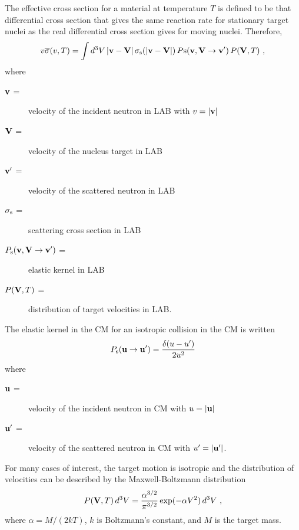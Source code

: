 The effective cross section for a material at temperature $T$ is defined
to be that differential cross section that gives the same reaction rate
for stationary target nuclei as the real differential cross section gives
for moving nuclei. Therefore,
\begin{equation}
  v {\overline \sigma}(v,T)=
    \int d^3V \, |{\bf v}-{\bf V}|\,\sigma_{\rm s}(|{\bf v}-{\bf V}|) \,
    P{\rm s}({\bf v},{\bf V} \rightarrow {\bf v}') \,P({\bf V},T)\,\,,
\label{resk1}
\end{equation}
\noindent where
\begin{description}
\item [${\bf v}$ =] velocity of the incident neutron in LAB with $v=|{\bf v}|$
\item [${\bf V}$ =] velocity of the nucleus target in LAB
\item [${\bf v}'$ =] velocity of the scattered neutron in LAB
\item [$\sigma_{\rm s}$ =] scattering cross section in LAB
\item [$P_{\rm s}({\bf v},{\bf V} \rightarrow {\bf v}')$ =] elastic kernel
in LAB
\item [$P({\bf V},T)$ =] distribution of target velocities in LAB.
\end{description}

The elastic kernel in the CM for an isotropic collision in the CM is
written\cite{OUISLOUMEN}
\begin{equation}
P_{\rm s}({\bf u} \rightarrow {\bf u}')={\delta(u-u')\over 2u^2}
\label{resk2}
\end{equation}
\noindent where
\begin{description}
\item [${\bf u}$ =] velocity of the incident neutron in CM with $u=|{\bf u}|$
\item [${\bf u}'$ =] velocity of the scattered neutron in CM with
$u'=|{\bf u}'|$.
\end{description}

For many cases of interest, the target motion is isotropic and the
distribution of velocities can be described by the
Maxwell-Boltzmann distribution
\begin{equation}
  P({\bf V},T)\,d^3V=
    {{\alpha^{3/2}} \over {\pi^{3/2}}} \exp (-\alpha {V}^2)\, d^3V\,\,,
\label{resk3}
\end{equation}
where $\alpha=M/(2kT)$, $k$ is Boltzmann's constant, and $M$ is the target mass.

